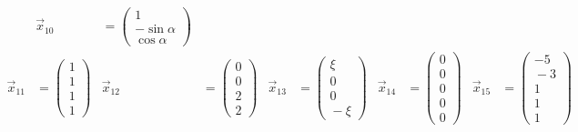 \begin{align*}
&\vec{x}_{10}&=\left(\begin{array}{c}1\\-\sin\alpha\\{}\cos\alpha\end{array}\right)\\
\vec{x}_{11}&=\left(\begin{array}{c}1\\1\\1\\1\end{array}\right)
&\vec{x}_{12}&=\left(\begin{array}{c}0\\0\\2\\2\end{array}\right)
&\vec{x}_{13}&=\left(\begin{array}{c}\xi\\0\\0\\{}-\xi\end{array}\right)
&\vec{x}_{14}&=\left(\begin{array}{c}0\\0\\0\\0\\0\end{array}\right)
&\vec{x}_{15}&=\left(\begin{array}{c}-5\\{}-3\\1\\1\\1\end{array}\right)
\end{align*}




